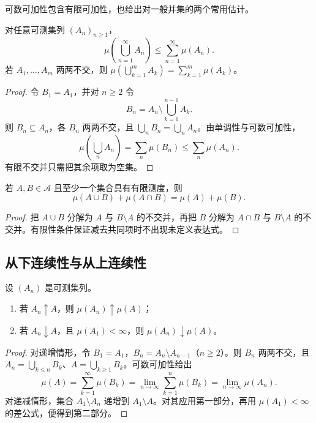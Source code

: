 可数可加性包含有限可加性，也给出对一般并集的两个常用估计。

\begin{proposition}
\label{b1:prop:measure-subadditivity}
对任意可测集列 \((A_n)_{n\geq1}\)，
\[
\mu\left(\bigcup_{n=1}^{\infty}A_n\right)
\leq\sum_{n=1}^{\infty}\mu(A_n).
\]
若 \(A_1,\ldots,A_m\) 两两不交，则 \(\mu(\bigcup_{k=1}^{m}A_k)=\sum_{k=1}^{m}\mu(A_k)\)。
\end{proposition}
\begin{proof}
令 \(B_1=A_1\)，并对 \(n\geq2\) 令
\[
B_n=A_n\setminus\bigcup_{k=1}^{n-1}A_k.
\]
则 \(B_n\subseteq A_n\)，各 \(B_n\) 两两不交，且 \(\bigcup_nB_n=\bigcup_nA_n\)。由单调性与可数可加性，
\[
\mu\left(\bigcup_nA_n\right)
=\sum_n\mu(B_n)
\leq\sum_n\mu(A_n).
\]
有限不交并只需把其余项取为空集。
\end{proof}

\begin{proposition}
\label{b1:prop:measure-inclusion-exclusion}
若 \(A,B\in\mathcal A\) 且至少一个集合具有有限测度，则
\[
\mu(A\cup B)+\mu(A\cap B)=\mu(A)+\mu(B).
\]
\end{proposition}
\begin{proof}
把 \(A\cup B\) 分解为 \(A\) 与 \(B\setminus A\) 的不交并，再把 \(B\) 分解为 \(A\cap B\) 与 \(B\setminus A\) 的不交并。有限性条件保证减去共同项时不出现未定义表达式。
\end{proof}

\subsection{从下连续性与从上连续性}
\label{b1:subsec:020103}

\begin{theorem}
\label{b1:thm:measure-continuity}
设 \((A_n)\) 是可测集列。
\begin{enumerate}
  \item 若 \(A_n\uparrow A\)，则 \(\mu(A_n)\uparrow\mu(A)\)；
  \item 若 \(A_n\downarrow A\)，且 \(\mu(A_1)<\infty\)，则 \(\mu(A_n)\downarrow\mu(A)\)。
\end{enumerate}
\end{theorem}
\begin{proof}
对递增情形，令 \(B_1=A_1\)，\(B_n=A_n\setminus A_{n-1}\)（\(n\geq2\)）。则 \(B_n\) 两两不交，且 \(A_n=\bigcup_{k\leq n}B_k\)、\(A=\bigcup_{k\geq1}B_k\)。可数可加性给出
\[
\mu(A)=\sum_{k=1}^{\infty}\mu(B_k)
=\lim_{n\to\infty}\sum_{k=1}^{n}\mu(B_k)
=\lim_{n\to\infty}\mu(A_n).
\]
对递减情形，集合 \(A_1\setminus A_n\) 递增到 \(A_1\setminus A\)。对其应用第一部分，再用 \(\mu(A_1)<\infty\) 的差公式，便得到第二部分。
\end{proof}

